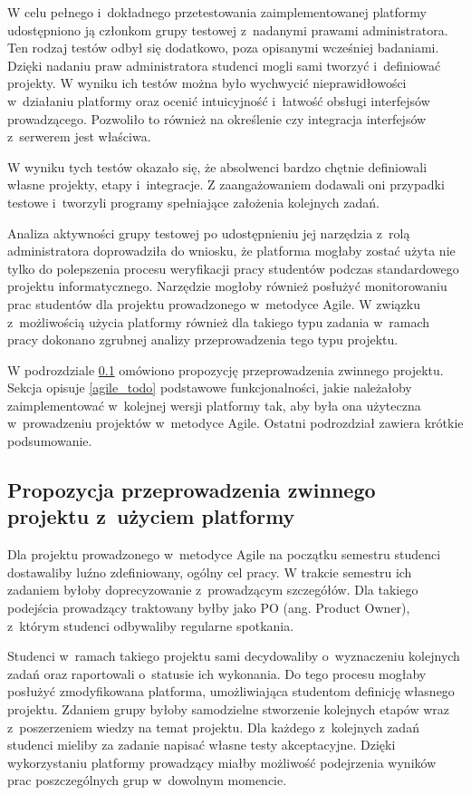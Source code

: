 W celu pełnego i~dokładnego przetestowania zaimplementowanej platformy udostępniono ją członkom grupy testowej z~nadanymi prawami administratora.
Ten rodzaj testów odbył się dodatkowo, poza opisanymi wcześniej badaniami.
Dzięki nadaniu praw administratora studenci mogli sami tworzyć i~definiować projekty.
W wyniku ich testów można było wychwycić nieprawidłowości w~działaniu platformy oraz ocenić intuicyjność i~łatwość obsługi interfejsów prowadzącego.
Pozwoliło to również na określenie czy integracja interfejsów z~serwerem jest właściwa.

W wyniku tych testów okazało się, że absolwenci bardzo chętnie definiowali własne projekty, etapy i~integracje.
Z zaangażowaniem dodawali oni przypadki testowe i~tworzyli programy spełniające założenia kolejnych zadań.

Analiza aktywności grupy testowej po udostępnieniu jej narzędzia z~rolą administratora doprowadziła do wniosku, że platforma mogłaby zostać użyta nie tylko do polepszenia procesu weryfikacji pracy studentów podczas standardowego projektu informatycznego.
Narzędzie mogłoby również posłużyć monitorowaniu prac studentów dla projektu prowadzonego w~metodyce Agile.
W związku z~możliwością użycia platformy również dla takiego typu zadania w~ramach pracy dokonano zgrubnej analizy przeprowadzenia tego typu projektu.

W podrozdziale \ref{agile_proposition} omówiono propozycję przeprowadzenia zwinnego projektu.
Sekcja opisuje \ref{agile_todo} podstawowe funkcjonalności, jakie należałoby zaimplementować w~kolejnej wersji platformy tak, aby była ona użyteczna w~prowadzeniu projektów w~metodyce Agile.
Ostatni podrozdział zawiera krótkie podsumowanie.

\subsection{Propozycja przeprowadzenia zwinnego projektu z~użyciem platformy}
\label{agile_proposition}

Dla projektu prowadzonego w~metodyce Agile na początku semestru studenci dostawaliby luźno zdefiniowany, ogólny cel pracy.
W trakcie semestru ich zadaniem byłoby doprecyzowanie z~prowadzącym szczegółów.
Dla takiego podejścia prowadzący traktowany byłby jako PO (ang. Product Owner), z~którym studenci odbywaliby regularne spotkania.

Studenci w~ramach takiego projektu sami decydowaliby o~wyznaczeniu kolejnych zadań oraz raportowali o~statusie ich wykonania.
Do tego procesu mogłaby posłużyć zmodyfikowana platforma, umożliwiająca studentom definicję własnego projektu.
Zdaniem grupy byłoby samodzielne stworzenie kolejnych etapów wraz z~poszerzeniem wiedzy na temat projektu.
Dla każdego z~kolejnych zadań studenci mieliby za zadanie napisać własne testy akceptacyjne.
Dzięki wykorzystaniu platformy prowadzący miałby możliwość podejrzenia wyników prac poszczególnych grup w~dowolnym momencie.

